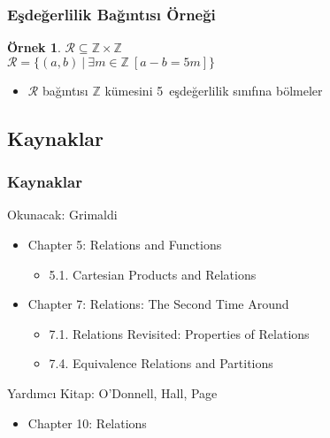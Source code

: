 \documentclass[dvipsnames]{beamer}
\theoremstyle{definition}
\theoremstyle{example}
\newtheorem{ornek}[theorem]{Örnek}
\theoremstyle{plain}
\begin{document}
\begin{frame}
  \frametitle{Eşdeğerlilik Bağıntısı Örneği}

  \begin{ornek}
    $\mathcal{R} \subseteq \mathbb{Z} \times \mathbb{Z}$\\
    $\mathcal{R} = \{(a,b)~|~\exists m \in \mathbb{Z}~[a - b = 5m]\}$

    \bigskip
    \begin{itemize}
      \item $\mathcal{R}$ bağıntısı $\mathbb{Z}$ kümesini 5~eşdeğerlilik sınıfına
        bölmeler
    \end{itemize}

  \end{ornek}
\end{frame}

\subsection*{Kaynaklar}

\begin{frame}
  \frametitle{Kaynaklar}

  \begin{block}{Okunacak: Grimaldi}
    \begin{itemize}
      \item Chapter 5: Relations and Functions
      \begin{itemize}
        \item 5.1. \alert{Cartesian Products and Relations}
      \end{itemize}
      \item Chapter 7: Relations: The Second Time Around
      \begin{itemize}
        \item 7.1. \alert{Relations Revisited: Properties of Relations}
        \item 7.4. \alert{Equivalence Relations and Partitions}
      \end{itemize}
    \end{itemize}
  \end{block}

  \begin{block}{Yardımcı Kitap: O'Donnell, Hall, Page}
    \begin{itemize}
      \item Chapter 10: Relations
    \end{itemize}
  \end{block}
\end{frame}
\end{document}
